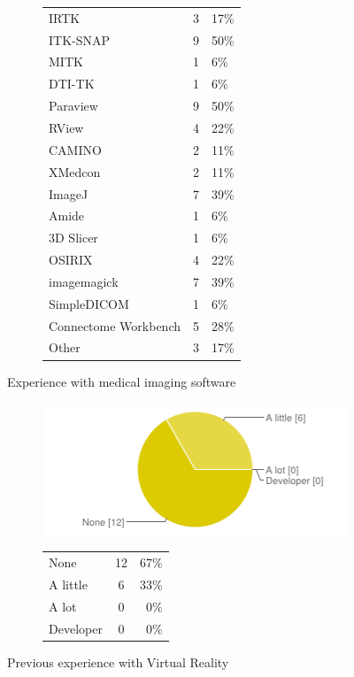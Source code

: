 \documentclass[MSc,paper=a4,pagesize=auto]{icldt}
\begin{document}
\begin{figure}[htbp!]
\begin{subfigure}{\textwidth}
\begin{tabular}{ l c p{4cm} }
	IRTK					&3&17\% \\
	ITK-SNAP				&9&50\% \\
	MITK					&1&6\% \\
	DTI-TK				&1&6\% \\
	Paraview				&9&50\% \\
	RView				&4&22\% \\
	CAMINO				&2&11\% \\
	XMedcon				&2&11\% \\
	ImageJ				&7&39\% \\
	Amide				&1&6\% \\
	3D Slicer			&1&6\% \\
	OSIRIX				&4&22\% \\
	imagemagick			&7&39\% \\
	SimpleDICOM			&1&6\% \\
	Connectome Workbench	&5&28\% \\
	Other				&3&17\% \\
\end{tabular}
\end{subfigure} 
    \caption{Experience with medical imaging software}
    \label{fig:3-medical_imaging_packages}
\end{figure}
\clearpage
\begin{figure}[htbp!]
\centering
\begin{subfigure}{0.4\textwidth}
    \centering
    \includegraphics[width=1\linewidth]{resources/4-vr_experience}
\end{subfigure}%
\centering
\begin{subfigure}{\textwidth}
    \centering
   	\begin{tabular}{ l c r }
None&12&67\% \\
A little&6&33\% \\
A lot&0&0\% \\
Developer&0&0\% \\
\end{tabular}
\end{subfigure} 
    \caption{Previous experience with Virtual Reality}
    \label{fig:4-vr_experience}
\end{figure}
\end{document}
